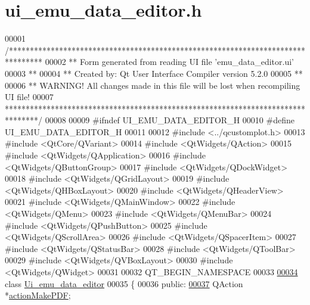 \hypertarget{a00051_source}{\section{ui\+\_\+emu\+\_\+data\+\_\+editor.\+h}
\label{a00051_source}
}

\begin{DoxyCode}
00001 \textcolor{comment}{/********************************************************************************}
00002 \textcolor{comment}{** Form generated from reading UI file 'emu\_data\_editor.ui'}
00003 \textcolor{comment}{**}
00004 \textcolor{comment}{** Created by: Qt User Interface Compiler version 5.2.0}
00005 \textcolor{comment}{**}
00006 \textcolor{comment}{** WARNING! All changes made in this file will be lost when recompiling UI file!}
00007 \textcolor{comment}{********************************************************************************/}
00008 
00009 \textcolor{preprocessor}{#ifndef UI\_EMU\_DATA\_EDITOR\_H}
00010 \textcolor{preprocessor}{#define UI\_EMU\_DATA\_EDITOR\_H}
00011 
00012 \textcolor{preprocessor}{#include <../qcustomplot.h>}
00013 \textcolor{preprocessor}{#include <QtCore/QVariant>}
00014 \textcolor{preprocessor}{#include <QtWidgets/QAction>}
00015 \textcolor{preprocessor}{#include <QtWidgets/QApplication>}
00016 \textcolor{preprocessor}{#include <QtWidgets/QButtonGroup>}
00017 \textcolor{preprocessor}{#include <QtWidgets/QDockWidget>}
00018 \textcolor{preprocessor}{#include <QtWidgets/QGridLayout>}
00019 \textcolor{preprocessor}{#include <QtWidgets/QHBoxLayout>}
00020 \textcolor{preprocessor}{#include <QtWidgets/QHeaderView>}
00021 \textcolor{preprocessor}{#include <QtWidgets/QMainWindow>}
00022 \textcolor{preprocessor}{#include <QtWidgets/QMenu>}
00023 \textcolor{preprocessor}{#include <QtWidgets/QMenuBar>}
00024 \textcolor{preprocessor}{#include <QtWidgets/QPushButton>}
00025 \textcolor{preprocessor}{#include <QtWidgets/QScrollArea>}
00026 \textcolor{preprocessor}{#include <QtWidgets/QSpacerItem>}
00027 \textcolor{preprocessor}{#include <QtWidgets/QStatusBar>}
00028 \textcolor{preprocessor}{#include <QtWidgets/QToolBar>}
00029 \textcolor{preprocessor}{#include <QtWidgets/QVBoxLayout>}
00030 \textcolor{preprocessor}{#include <QtWidgets/QWidget>}
00031 
00032 QT\_BEGIN\_NAMESPACE
00033 
\hypertarget{a00051_source_l00034}{}\hyperlink{a00026}{00034} \textcolor{keyword}{class }\hyperlink{a00026}{Ui\_emu\_data\_editor}
00035 \{
00036 \textcolor{keyword}{public}:
\hypertarget{a00051_source_l00037}{}\hyperlink{a00026_af013c084ff0ed9ae39a60aa7a39bdd91}{00037}     QAction *\hyperlink{a00026_af013c084ff0ed9ae39a60aa7a39bdd91}{actionMakePDF};

\end{DoxyCode}
